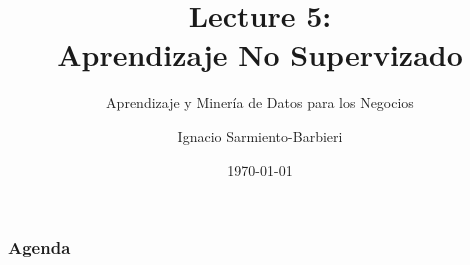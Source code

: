 \documentclass[
  shownotes,
  xcolor={svgnames},
  hyperref={colorlinks,citecolor=DarkBlue,linkcolor=DarkRed,urlcolor=DarkBlue}
  , aspectratio=169]{beamer}
\begin{document}
\title[Lecture 5]{Lecture 5: \\ Aprendizaje No Supervizado}
\subtitle{Aprendizaje y Minería de Datos para los Negocios}
\date{\today}

\author[Sarmiento-Barbieri]{Ignacio Sarmiento-Barbieri}


\begin{frame}[noframenumbering]
\maketitle
\end{frame}





\begin{frame}
\frametitle{Agenda}

\tableofcontents

\end{frame}

\end{document}
